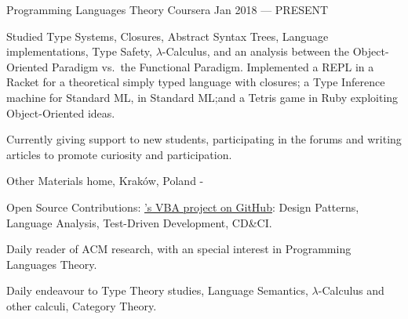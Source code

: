 
\begin{cventries}

    {Programming Languages Theory}
    {Coursera}
    {Jan 2018 --- PRESENT}
    {
        \begin{cvitems} %
        \item {Studied Type Systems, Closures, Abstract Syntax Trees, Language implementations, Type
                Safety, $\lambda$-Calculus, and an analysis between the Object-Oriented Paradigm
                vs.\ the Functional Paradigm. Implemented a REPL in a Racket for a theoretical
                simply typed language with closures; a Type Inference machine for Standard ML, in
                Standard ML;\@ and a Tetris game in Ruby exploiting Object-Oriented ideas.}
        \item {Currently giving support to new students, participating in the forums and writing articles to promote curiosity and participation.}
        \end{cvitems}
    }

    {Other Materials}
    {home, Kraków, Poland}
    {-}
    {
        \begin{cvitems} %
        \item {Open Source Contributions: \href{https://github.com/rubberduck-vba/Rubberduck}{'s VBA project on GitHub}: Design Patterns, Language Analysis, Test-Driven Development, CD\&CI.}
        \item {Daily reader of ACM research, with an special interest in Programming Languages Theory.}
        \item {Daily endeavour to Type Theory studies, Language Semantics, $\lambda$-Calculus and other calculi, Category Theory.}
        \end{cvitems}
    }

\end{cventries}
